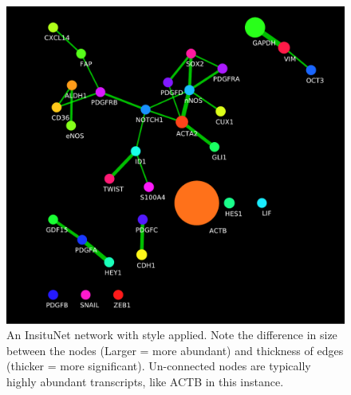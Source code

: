 \documentclass[a4paper,12pt]{article}
\begin{document}
\begin{figure}[htb]
	\caption{An InsituNet network with style applied. Note the difference in size between the nodes (Larger = more abundant) and thickness of edges (thicker = more significant). Un-connected nodes are typically highly abundant transcripts, like ACTB in this instance.}
	\label{fig:net}
	\centering
	\includegraphics[width=\textwidth]{net}
\end{figure}
\end{document}
